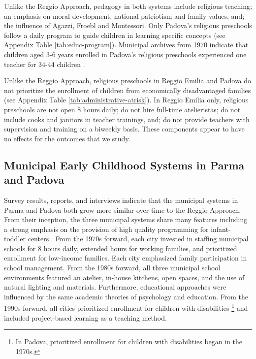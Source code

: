 Unlike the Reggio Approach, pedagogy in both systems include religious teaching; an emphasis on moral development, national patriotism and family values, and; the influence of Agazzi, Froebl and Montessori. Only Padova's religious preschools follow a daily program to guide children in learning specific concepts (see Appendix Table \ref{tab:educ-program}). Municipal archives from 1970 indicate that children aged 3-6 years enrolled in Padova's religious preschools experienced one teacher for 34-44 children \citep{Padova-Admin-Data_1964-2011}. 

Unlike the Reggio Approach, religious preschools in Reggio Emilia and Padova do not prioritize the enrollment of children from economically disadvantaged families (see Appendix Table \ref{tab:administrative-atrisk}).  In Reggio Emilia only, religious preschools are not open 8 hours daily; do not hire full-time atelieristas; do not include cooks and janitors in teacher trainings, and; do not provide teachers with supervision and training on a biweekly basis. These components appear to have no effects for the outcomes that we study.

\subsection{Municipal Early Childhood Systems in Parma and Padova}

Survey results, reports, and interviews indicate that the municipal systems in Parma and Padova both grow more similar over time to the Reggio Approach. From their inception, the three municipal systems share many features including a strong emphasis on the provision of high quality programming for infant-toddler centers \citep{Ghedini_2001_Ital-Natl-Policy}. From the 1970s forward, each city invested in staffing municipal schools for 8 hours daily, extended hours for working families, and prioritized enrollment for low-income families. Each city emphasized family participation in school management. From the 1980s forward, all three municipal school environments featured an atelier, in-house kitchens, open spaces, and the use of natural lighting and materials. Furthermore, educational approaches were influenced by the same academic theories of psychology and education. From the 1990s forward, all cities prioritized enrollment for children with disabilities \footnote{In Padova, prioritized enrollment for children with disabilities began in the 1970s.} and included project-based learning as a teaching method.

